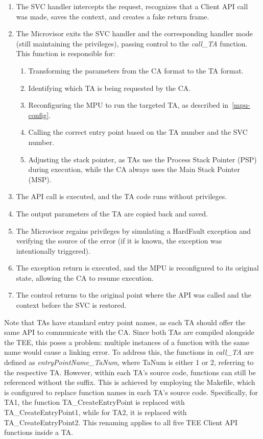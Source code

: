 \documentclass{article}
\begin{document}
\begin{enumerate}
    \item The SVC handler intercepts the request, recognizes that a Client API call was made, saves the context, and creates a fake return frame.
    \item The Microvisor exits the SVC handler and the corresponding handler mode (still maintaining the privileges), passing control to the \textit{call\_TA} function. This function is responsible for:
    \begin{enumerate}
        \item Transforming the parameters from the CA format to the TA format.
        \item Identifying which TA is being requested by the CA.
        \item Reconfiguring the MPU to run the targeted TA, as described in~\autoref{mpu-config}.
        \item Calling the correct entry point based on the TA number and the SVC number.
        \item Adjusting the stack pointer, as TAs use the Process Stack Pointer (PSP) during execution, while the CA always uses the Main Stack Pointer (MSP).
    \end{enumerate}
    \item The API call is executed, and the TA code runs without privileges.
    \item The output parameters of the TA are copied back and saved. 
    \item The Microvisor regains privileges by simulating a HardFault exception and verifying the source of the error (if it is known, the exception was intentionally triggered).
    \item The exception return is executed, and the MPU is reconfigured to its original state, allowing the CA to resume execution.
    \item The control returns to the original point where the API was called and the context before the SVC is restored.
\end{enumerate}

Note that TAs have standard entry point names, as each TA should offer the same API to communicate with the CA. Since both TAs are compiled alongside the TEE, this poses a problem: multiple instances of a function with the same name would cause a linking error. To address this, the functions in \textit{call\_TA} are defined as \textit{entryPointName\_TaNum}, where TaNum is either 1 or 2, referring to the respective TA. However, within each TA's source code, functions can still be referenced without the suffix. This is achieved by employing the Makefile, which is configured to replace function names in each TA's source code. Specifically, for TA1, the function TA\_CreateEntryPoint is replaced with TA\_CreateEntryPoint1, while for TA2, it is replaced with TA\_CreateEntryPoint2. This renaming applies to all five TEE Client API functions inside a TA. 
\end{document}
